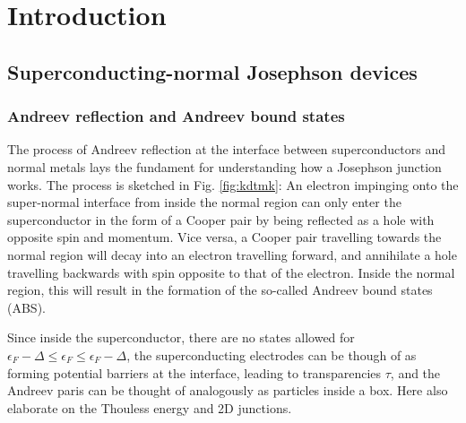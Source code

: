 \newchapstyle
\chapter{Introduction}
\label{chap:intro}



\afterpage{\pagecolor{none}}\newpage

\section{Superconducting-normal Josephson devices}

\subsection{Andreev reflection and Andreev bound states}

The process of Andreev reflection at the interface between superconductors and normal metals lays the fundament for understanding how a Josephson junction works.
%
The process is sketched in Fig. \ref{fig:kdtmk}:
%
An electron impinging onto the super-normal interface from inside the normal region can only enter the superconductor in the form of a Cooper pair by being reflected as a hole with opposite spin and momentum.
%
Vice versa, a Cooper pair travelling towards the normal region will decay into an electron travelling forward, and annihilate a hole travelling backwards with spin opposite to that of the electron.
%
Inside the normal region, this will result in the formation of the so-called Andreev bound states (ABS).

Since inside the superconductor, there are no states allowed for $\epsilon_F - \Delta \leq \epsilon_F \leq \epsilon_F - \Delta$, the superconducting electrodes can be though of as forming potential barriers at the interface, leading to transparencies $\tau$, and the Andreev paris can be thought of analogously as particles inside a box.
%
Here also elaborate on the Thouless energy and 2D junctions.

